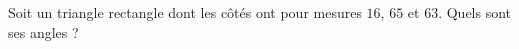 
\begin{exercice}\label{exo2smath-0148}

    Soit un triangle rectangle dont les côtés ont pour mesures \( 16\), \( 65\) et \( 63\). Quels sont ses angles ?

\end{exercice}
